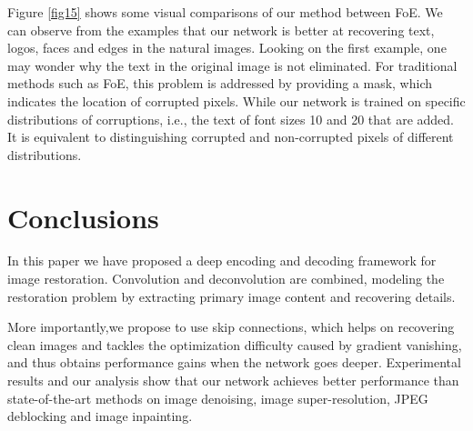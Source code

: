\documentclass[10pt,journal,compsoc]{IEEEtran}
\begin{document}
Figure \ref{fig15} shows some visual comparisons of our method between FoE. We can
observe from the examples that our network is better at recovering text, logos,
faces and edges in the natural images. Looking on the first example, one may wonder
why the text in the original image is not eliminated. For traditional methods
such as FoE, this problem is addressed by providing a mask, which indicates the
location of corrupted pixels. While our network is trained on specific distributions
of corruptions, i.e., the text of font sizes 10 and 20 that are added.
It is equivalent to distinguishing corrupted and non-corrupted pixels of different distributions.

\begin{figure*}
\centering
{}
\caption{Visual results of our method and FoE. Images from left to right are:
Corrupted images, the inpainting results of FoE and the inpainting results of our method. We see better recovered details as shown in the zoomed
patches.}
\label{fig15}
\end{figure*}



 \section{Conclusions}

In this paper we have proposed a deep encoding and decoding framework
for image restoration. Convolution and deconvolution are combined,
modeling the restoration problem by extracting primary image content and recovering details.

More importantly,we propose to use skip connections, which helps on recovering
clean images and tackles the optimization difficulty caused by gradient
vanishing, and thus obtains performance gains when the network goes deeper.
Experimental results and our analysis show that our network achieves better
performance than state-of-the-art methods on image denoising,
image super-resolution, JPEG deblocking and image inpainting.
 
{
    \medskip
    
    
}
\end{document}
